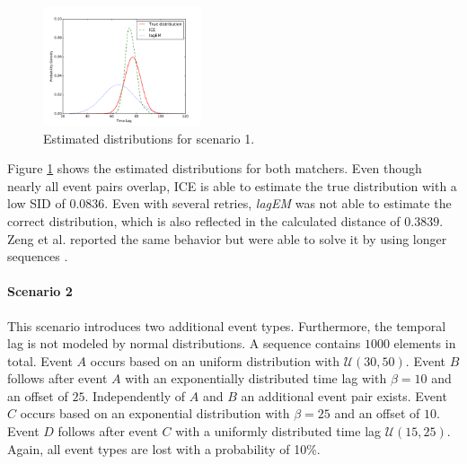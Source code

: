 \documentclass[conference]{IEEEtran}
\theoremstyle{examplestyle}
\newcommand\imgsize{0.415}
\begin{document}
\begin{figure}[!tb]
	\centering
	\includegraphics[width=\imgsize\textwidth]{images/scenarios/1.pdf}
	\caption{Estimated distributions for scenario 1.}
	\label{fig:scen1}
\end{figure}

Figure \ref{fig:scen1} shows the estimated distributions for both matchers. Even though nearly all event pairs overlap, \ac{ICE} is able to estimate the true distribution with a low \ac{SID} of $0.0836$. Even with several retries, \textit{lagEM} was not able to estimate the correct distribution, which is also reflected in the calculated distance of $0.3839$. Zeng et al. reported the same behavior but were able to solve it by using longer sequences \cite{Zeng2015}.



\paragraph{Scenario 2}
This scenario introduces two additional event types. Furthermore, the temporal lag is not modeled by normal distributions. A sequence contains $1000$ elements in total. Event \(A\) occurs based on an uniform distribution with \(\mathcal{U}(30, 50)\). Event \(B\) follows after event \(A\) with an exponentially distributed time lag with \(\beta = 10\) and an offset of $25$. Independently of \(A\) and \(B\) an additional event pair exists. Event \(C\) occurs based on an exponential distribution with \(\beta = 25\) and an offset of $10$. Event \(D\) follows after event \(C\) with a uniformly distributed time lag \(\mathcal{U}(15, 25)\). Again, all event types are lost with a probability of 10\%.
\end{document}
